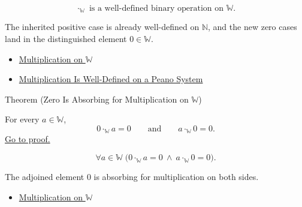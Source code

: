\begin{remark*}
\[
\cdot_{\mathbb{W}}\text{ is a well-defined binary operation on }\mathbb{W}.
\]
\end{remark*}

\begin{remark*}[Interpretation]
The inherited positive case is already well-defined on $\mathbb{N}$, and the
new zero cases land in the distinguished element $0\in\mathbb{W}$.
\end{remark*}

\begin{dependencies}
\begin{itemize}
  \item \hyperref[def:multiplication-on-w]{Multiplication on $\mathbb{W}$}
  \item \hyperref[thm:multiplication-well-defined-on-peano-system]{Multiplication Is Well-Defined on a Peano System}
\end{itemize}
\end{dependencies}

\begin{theorembox}{Theorem (Zero Is Absorbing for Multiplication on \texorpdfstring{$\mathbb{W}$}{W})}
\begin{theorem}
\label{thm:zero-absorbing-for-multiplication-on-w}
For every $a\in\mathbb{W}$,
\[
0\cdot_{\mathbb{W}}a=0
\qquad\text{and}\qquad
a\cdot_{\mathbb{W}}0=0.
\]
\hyperref[prf:zero-absorbing-for-multiplication-on-w]{Go to proof.}
\end{theorem}
\end{theorembox}

\begin{remark*}
\[
\forall a\in\mathbb{W}\;
\bigl(0\cdot_{\mathbb{W}}a=0\ \wedge\ a\cdot_{\mathbb{W}}0=0\bigr).
\]
\end{remark*}

\begin{remark*}[Interpretation]
The adjoined element $0$ is absorbing for multiplication on both sides.
\end{remark*}

\begin{dependencies}
\begin{itemize}
  \item \hyperref[def:multiplication-on-w]{Multiplication on $\mathbb{W}$}
\end{itemize}
\end{dependencies}

